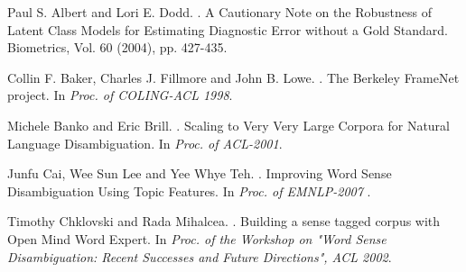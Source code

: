 \documentclass[11pt]{article}
\begin{document}

\begin{thebibliography}{}%


Paul S. Albert and Lori E. Dodd.
.
\newblock A Cautionary Note on the Robustness of Latent Class Models for Estimating Diagnostic Error without a Gold Standard. 
\newblock Biometrics, Vol. 60 (2004), pp. 427-435.


Collin F. Baker, Charles J. Fillmore and John B. Lowe.
.
\newblock The Berkeley FrameNet project. 
\newblock In \textit{Proc. of COLING-ACL 1998}.

Michele Banko and Eric Brill.
.
\newblock Scaling to Very Very Large Corpora for Natural Language Disambiguation.
\newblock In \textit{Proc. of ACL-2001}.

Junfu Cai, Wee Sun Lee and Yee Whye Teh.
.
\newblock Improving Word Sense Disambiguation Using Topic Features.
\newblock In \textit{ Proc. of EMNLP-2007 }.


Timothy Chklovski and Rada Mihalcea.
.
\newblock Building a sense tagged corpus with Open Mind Word Expert. 
\newblock In \textit{ Proc. of the Workshop on "Word Sense Disambiguation: Recent Successes and Future Directions", ACL 2002}.


\end{thebibliography}
\end{document}
